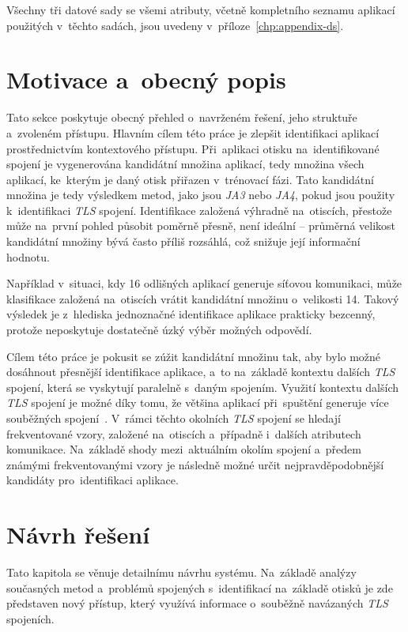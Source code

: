 Všechny tři datové sady se všemi atributy, včetně kompletního seznamu aplikací použitých v~těchto sadách, jsou uvedeny v~příloze~\ref{chp:appendix-ds}.


\section{Motivace a~obecný popis}
Tato sekce poskytuje obecný přehled o~navrženém řešení, jeho struktuře a~zvoleném přístupu. Hlavním cílem této práce je zlepšit identifikaci aplikací prostřednictvím kontextového přístupu. Při~aplikaci otisku na~identifikované spojení je vygenerována kandidátní množina aplikací, tedy množina všech aplikací, ke~kterým je daný otisk přiřazen v~trénovací fázi. Tato kandidátní množina je tedy výsledkem metod, jako jsou \textit{JA3} nebo \textit{JA4}, pokud jsou použity k~identifikaci \textit{TLS} spojení. Identifikace založená výhradně na~otiscích, přestože může na~první pohled působit poměrně přesně, není ideální – průměrná velikost kandidátní množiny bývá často příliš rozsáhlá, což snižuje její informační hodnotu.

Například v~situaci, kdy 16 odlišných aplikací generuje síťovou komunikaci, může klasifikace založená na~otiscích vrátit kandidátní množinu o~velikosti 14. Takový výsledek je z~hlediska jednoznačné identifikace aplikace prakticky bezcenný, protože neposkytuje dostatečně úzký výběr možných odpovědí. 

Cílem této práce je pokusit se zúžit kandidátní množinu tak, aby bylo možné dosáhnout přesnější identifikace aplikace, a~to na~základě kontextu dalších \textit{TLS} spojení, která se vyskytují paralelně s~daným spojením. Využití kontextu dalších \textit{TLS} spojení je možné díky tomu, že většina aplikací při~spuštění generuje více souběžných spojení~\cite{tls-mulitple-conns}. V~rámci těchto okolních \textit{TLS} spojení se hledají frekventované vzory, založené na~otiscích a~případně i~dalších atributech komunikace. Na~základě shody mezi~aktuálním okolím spojení a~předem známými frekventovanými vzory je následně možné určit nejpravděpodobnější kandidáty pro~identifikaci aplikace. 

\section{Návrh řešení}
Tato kapitola se věnuje detailnímu návrhu systému. Na~základě analýzy současných metod a~problémů spojených s~identifikací na~základě otisků je zde představen nový přístup, který využívá informace o~souběžně navázaných \textit{TLS} spojeních.

